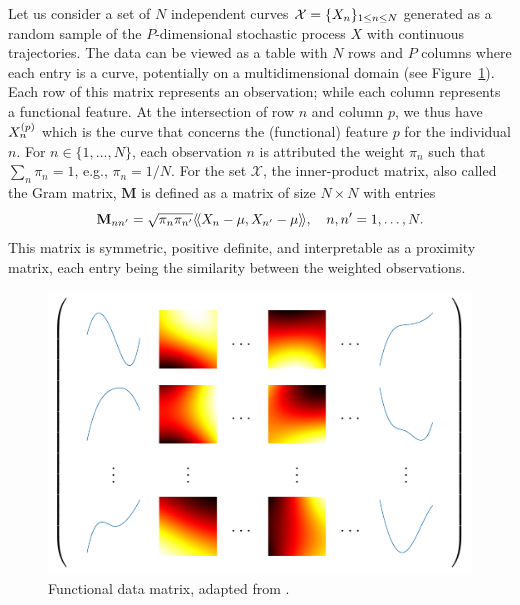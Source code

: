 Let us consider a set of $N$ independent curves $\mathcal{X} = \{X_n\}_{1 \leq n \leq N}$ generated as a random sample of the $P$-dimensional stochastic process $X$ with continuous trajectories. The data can be viewed as a table with $N$ rows and $P$ columns where each entry is a curve, potentially on a multidimensional domain (see Figure~\ref{fig:data_matrix}). Each row of this matrix represents an observation; while each column represents a functional feature. At the intersection of row $n$ and column $p$, we thus have $X_n^{(p)}$ which is the curve that concerns the (functional) feature $p$ for the individual $n$. For $n \in \{1, \dots, N\}$, each observation $n$ is attributed the weight $\pi_n$ such that $\sum_n \pi_n = 1$, e.g., $\pi_n = 1/N$. For the set $\mathcal{X}$, the inner-product matrix, also called the Gram matrix, $\mathbf{M}$ is defined as a matrix of size $N \times N$ with entries
\begin{equation}\label{eq:gram_mat}
    \mathbf{M}_{nn^\prime} = \sqrt{\pi_n \pi_{n^{\prime}}}\langle\!\langle X_n - \mu, X_{n^\prime} - \mu\rangle\!\rangle, \quad n, n^\prime = 1, \dots, N.
\end{equation}
This matrix is symmetric, positive definite, and interpretable as a proximity matrix, each entry being the similarity between the weighted observations.

\begin{figure}
    \centering
    \includegraphics[]{figures/data_matrix.pdf}
    \caption{Functional data matrix, adapted from \cite{berrenderoPrincipalComponentsMultivariate2011}.}
    \label{fig:data_matrix}
\end{figure}

